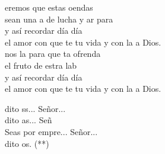 \begin{cancion}%
	eremos que estas oendas \\
	sean una a de lucha y ar para \\
	y así recordar día día \\
	el amor con que te tu vida y con la a Dios.\\
	\jump
	nos la  para que ta ofrenda \\
	 el fruto de estra lab\\
	y así recordar día día \\
	el amor con que te tu vida y con la a Dios.\jump\\
	\begin{chorus}%
		dito ss... Señor...\\
		dito as... Señ\\
		Seas por empre... Señor...\\
		dito os. (**)\jump\\
	\end{chorus}%
	\jump
\end{cancion}%
